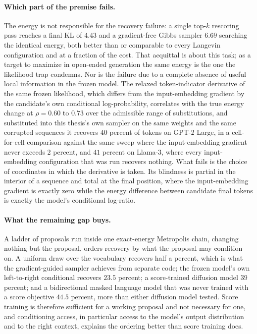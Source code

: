 \paragraph*{Which part of the premise fails.} The energy is not responsible for the recovery failure: a single top-$k$ rescoring pass reaches a final KL of $4.43$ and a gradient-free Gibbs sampler $6.69$ searching the identical energy, both better than or comparable to every Langevin configuration and at a fraction of the cost. That acquittal is about this task; as a target to maximize in open-ended generation the same energy is the one the likelihood trap condemns. Nor is the failure due to a complete absence of useful local information in the frozen model. The relaxed token-indicator derivative of the same frozen likelihood, which differs from the input-embedding gradient by the candidate's own conditional log-probability, correlates with the true energy change at $\rho = 0.60$ to $0.73$ over the admissible range of substitutions, and substituted into this thesis's own sampler on the same weights and the same corrupted sequences it recovers $40$ percent of tokens on GPT-2 Large, in a cell-for-cell comparison against the same sweep where the input-embedding gradient never exceeds $2$ percent, and $41$ percent on Llama-3, where every input-embedding configuration that was run recovers nothing. What fails is the choice of coordinates in which the derivative is taken. Its blindness is partial in the interior of a sequence and total at the final position, where the input-embedding gradient is exactly zero while the energy difference between candidate final tokens is exactly the model's conditional log-ratio.

\paragraph*{What the remaining gap buys.} A ladder of proposals run inside one exact-energy Metropolis chain, changing nothing but the proposal, orders recovery by what the proposal may condition on. A uniform draw over the vocabulary recovers half a percent, which is what the gradient-guided sampler achieves from separate code; the frozen model's own left-to-right conditional recovers $23.5$ percent; a score-trained diffusion model $39$ percent; and a bidirectional masked language model that was never trained with a score objective $44.5$ percent, more than either diffusion model tested. Score training is therefore sufficient for a working proposal and not necessary for one, and conditioning access, in particular access to the model's output distribution and to the right context, explains the ordering better than score training does.

